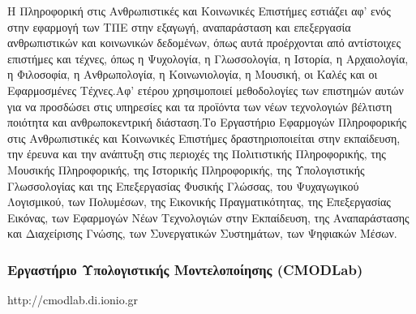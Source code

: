 Η Πληροφορική στις Ανθρωπιστικές και Κοινωνικές Επιστήμες εστιάζει αφ'
ενός στην εφαρμογή των ΤΠΕ στην εξαγωγή, αναπαράσταση και επεξεργασία
ανθρωπιστικών και κοινωνικών δεδομένων, όπως αυτά προέρχονται από
αντίστοιχες επιστήμες και τέχνες, όπως η Ψυχολογία, η Γλωσσολογία, η
Ιστορία, η Αρχαιολογία, η Φιλοσοφία, η Ανθρωπολογία, η Κοινωνιολογία, η
Μουσική, οι Καλές και οι Εφαρμοσμένες Τέχνες.Αφ' ετέρου χρησιμοποιεί
μεθοδολογίες των επιστημών αυτών για να προσδώσει στις υπηρεσίες και τα
προϊόντα των νέων τεχνολογιών βέλτιστη ποιότητα και ανθρωποκεντρική
διάσταση.Το Εργαστήριο Εφαρμογών Πληροφορικής στις Ανθρωπιστικές και
Κοινωνικές Επιστήμες δραστηριοποιείται στην εκπαίδευση, την έρευνα και
την ανάπτυξη στις περιοχές της Πολιτιστικής Πληροφορικής, της Μουσικής
Πληροφορικής, της Ιστορικής Πληροφορικής, της Υπολογιστικής Γλωσσολογίας
και της Επεξεργασίας Φυσικής Γλώσσας, του Ψυχαγωγικού Λογισμικού, των
Πολυμέσων, της Εικονικής Πραγματικότητας, της Επεξεργασίας Εικόνας, των
Εφαρμογών Νέων Τεχνολογιών στην Εκπαίδευση, της Αναπαράστασης και
Διαχείρισης Γνώσης, των Συνεργατικών Συστημάτων, των Ψηφιακών Μέσων.

\hypertarget{ux3b5ux3c1ux3b3ux3b1ux3c3ux3c4ux3aeux3c1ux3b9ux3bf-ux3c5ux3c0ux3bfux3bbux3bfux3b3ux3b9ux3c3ux3c4ux3b9ux3baux3aeux3c2-ux3bcux3bfux3bdux3c4ux3b5ux3bbux3bfux3c0ux3bfux3afux3b7ux3c3ux3b7ux3c2-cmodlab}{%
\subsubsection{Εργαστήριο Υπολογιστικής Μοντελοποίησης
(CMODLab)}\label{ux3b5ux3c1ux3b3ux3b1ux3c3ux3c4ux3aeux3c1ux3b9ux3bf-ux3c5ux3c0ux3bfux3bbux3bfux3b3ux3b9ux3c3ux3c4ux3b9ux3baux3aeux3c2-ux3bcux3bfux3bdux3c4ux3b5ux3bbux3bfux3c0ux3bfux3afux3b7ux3c3ux3b7ux3c2-cmodlab}}

http://cmodlab.di.ionio.gr

